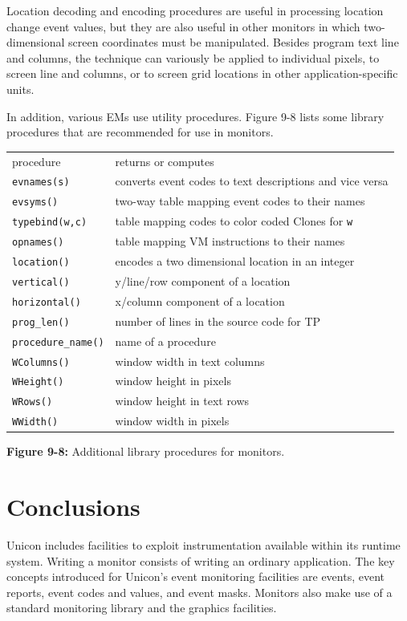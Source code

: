 Location decoding and encoding procedures are useful in processing 
location change event values, but they are also useful in other monitors
in which two-dimensional screen coordinates must be manipulated.
Besides program text line and columns, the technique can variously be
applied to individual pixels, to screen line and columns, or to screen
grid locations in other application-specific units.

In addition, various EMs use utility procedures.  Figure 9-8 lists some
library procedures that are recommended for use in monitors.

\begin{center}
\medskip

\begin{tabular}{|ll|} \hline
procedure  & returns or computes \\
{\tt evnames(s)} & converts event codes to text descriptions and vice versa\\
{\tt evsyms()} & two-way table mapping event codes to their names \\
{\tt typebind(w,c)} & table mapping codes to color coded Clones for {\tt w}\\
{\tt opnames()} & table mapping VM instructions to their names \\
{\tt location()} & encodes a two dimensional location in an integer \\
{\tt vertical()} & y/line/row component of a location \\
{\tt horizontal()} & x/column component of a location \\
{\tt prog\_len()} & number of lines in the source code for TP \\
{\tt procedure\_name()} & name of a procedure \\
{\tt WColumns()} & window width in text columns \\
{\tt WHeight()} & window height in pixels \\
{\tt WRows()} & window height in text rows \\
{\tt WWidth()} & window width in pixels \\
\hline
\end{tabular}

\end{center}
{\sffamily\bfseries Figure 9-8:}
{\sffamily Additional library procedures for monitors.}


\section{Conclusions}

Unicon includes facilities to exploit instrumentation available within its
runtime system.  Writing a monitor consists of writing an ordinary
application.  The key concepts introduced for Unicon's event monitoring
facilities are events, event reports, event codes and values, and event
masks.  Monitors also make use of a standard monitoring library and the
graphics facilities.
